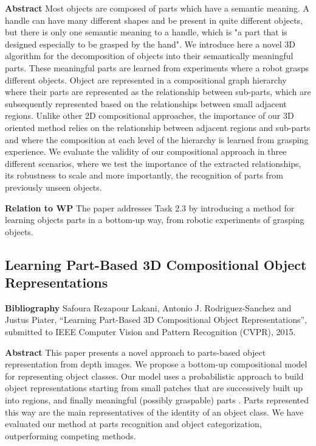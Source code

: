 \documentclass[a4paper,11pt,pdf]{../templates/pacmanreport}
\begin{document}
\textbf{Abstract} Most objects are composed of parts which have a semantic meaning. A handle can have many different shapes and be present in quite different objects, but there is only one semantic meaning to a handle, which is "a part that is designed especially to be grasped by the hand". We introduce here a novel 3D algorithm for the decomposition of objects into their semantically meaningful parts. These meaningful parts are learned from experiments where a robot grasps different objects. Object are represented in a compositional graph hierarchy where their parts are represented as the relationship between sub-parts, which are subsequently represented based on the relationships between small adjacent regions. Unlike other 2D compositional approaches, the importance of our 3D oriented method relies on the relationship between adjacent regions and sub-parts and where the composition at each level of the hierarchy is learned from grasping experience. We evaluate the validity of our compositional approach in three different scenarios, where we test the importance of the extracted relationships, its robustness to scale and more importantly, the recognition of parts from previously unseen objects. 

\textbf{Relation to WP}
The paper addresses Task 2.3 by introducing a method for learning objects parts in a bottom-up way, from robotic experiments of grasping objects.
 
 \newpage
 
\subsection{Learning Part-Based 3D Compositional Object Representations}
\label{ann:cvpr} 
\textbf{Bibliography} Safoura Rezapour Lakani, Antonio J. Rodriguez-Sanchez and Justus Piater, “Learning Part-Based 3D Compositional Object Representations”, submitted to IEEE Computer Vision and Pattern Recognition (CVPR), 2015.
 
\textbf{Abstract} This paper presents a novel approach to parts-based object representation from depth images. We propose a bottom-up compositional model for representing object classes. Our model uses a probabilistic approach to build object representations starting from small patches that are successively built up into regions, and finally meaningful (possibly graspable) parts . Parts represented this way are the main representatives of the identity of an object class. We have evaluated our method at parts recognition and object categorization, outperforming competing methods.
\end{document}
